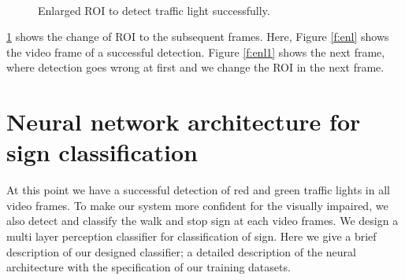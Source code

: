 \begin{figure}[!ht]
\centering
{}\\
\caption{Enlarged ROI to detect traffic light successfully.}
\label{f:rec_enl}
\end{figure}

\ref{f:rec_enl} shows the change of ROI to the subsequent frames.
Here, Figure \ref{f:enl} shows the video frame of a successful detection.
Figure \ref{f:enl1} shows the next frame, where detection goes wrong at first and we change the ROI in the next frame.

\section{Neural network architecture for sign classification}
At this point we have a successful detection of red and green traffic lights in all video frames.
To make our system more confident for the visually impaired, we also detect and classify the walk and stop sign at each video frames.
We design a multi layer perception classifier for classification of sign.
Here we give a brief description of our designed classifier; a detailed description of the neural architecture with the specification  of our training datasets.

